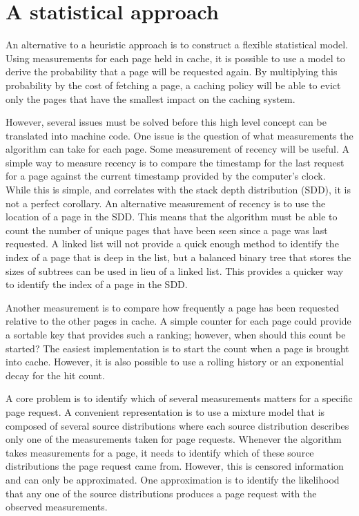 \section{A statistical approach}
  An alternative to a heuristic approach is to construct a flexible statistical
  model. Using measurements for each page held in cache, it is possible to use
  a model to derive the probability that a page will be requested again. By
  multiplying this probability by the cost of fetching a page, a caching policy
  will be able to evict only the pages that have the smallest impact on the
  caching system.

  However, several issues must be solved before this high level concept can be
  translated into machine code. One issue is the question of what measurements
  the algorithm can take for each page. Some measurement of recency will be
  useful. A simple way to measure recency is to compare the timestamp for the
  last request for a page against the current timestamp provided by the computer's
  clock. While this is simple, and correlates with the stack depth distribution
  (SDD), it is not a perfect corollary. An alternative measurement of recency is
  to use the location of a page in the SDD. This means that the algorithm
  must be able to count the number of unique pages that have been seen since a
  page was last requested. A linked list will not provide a quick enough method to
  identify the index of a page that is deep in the list, but a balanced binary
  tree that stores the sizes of subtrees can be used in lieu of a linked list.
  This provides a quicker way to identify the index of a page in the SDD.

  Another measurement is to compare how frequently a page has been requested
  relative to the other pages in cache. A simple counter for each page could
  provide a sortable key that provides such a ranking; however, when should this
  count be started? The easiest implementation is to start the count when
  a page is brought into cache. However, it is also possible to use a rolling
  history or an exponential decay for the hit count.

  A core problem is to identify which of several measurements matters for a
  specific page request. A convenient representation is to use a mixture model
  that is composed of several source distributions where each source distribution
  describes only one of the measurements taken for page requests. Whenever
  the algorithm takes measurements for a page, it needs to identify which
  of these source distributions the page request came from. However, this is
  censored information and can only be approximated. One approximation is to
  identify the likelihood that any one of the source distributions produces a
  page request with the observed measurements.

